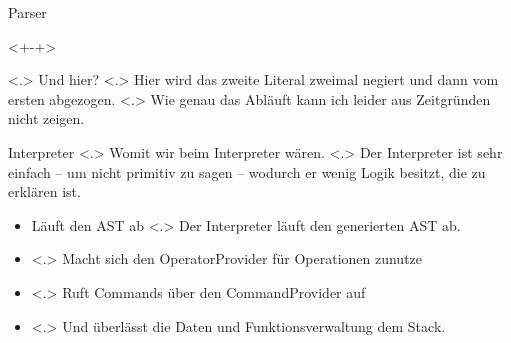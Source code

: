\begin{frame}{Parser}
\begin{itemize}[<+- | alert@+>]
          \begin{uncoverenv}<+-+>%
          \end{uncoverenv}
            \note[item]<.>{
              Und hier?
            }
            \note[item]<.>{
              Hier wird das zweite Literal zweimal negiert und dann vom ersten abgezogen.
            }
            \note[item]<.>{
              Wie genau das Abläuft kann ich leider aus Zeitgründen nicht zeigen.
            }
    \end{itemize}
  \end{frame}

  \begin{frame}{Interpreter}
    \pause
        \note[item]<.>{
          Womit wir beim Interpreter wären.
        }
        \note[item]<.>{
          Der Interpreter ist sehr einfach -- um nicht primitiv zu sagen -- wodurch er wenig Logik besitzt, die zu erklären ist.
        }
    \begin{itemize}[<+- | alert@+>]
      \item Läuft den AST ab
          \note[item]<.>{
            Der Interpreter läuft den generierten AST ab.
          }
      \item {}
          \note[item]<.>{
            Macht sich den OperatorProvider für Operationen zunutze
          }
      \item {}
          \note[item]<.>{
            Ruft Commands über den CommandProvider auf
          }
      \item {}
          \note[item]<.>{
            Und überlässt die Daten und Funktionsverwaltung dem Stack.
          }
    \end{itemize}
  \end{frame}



